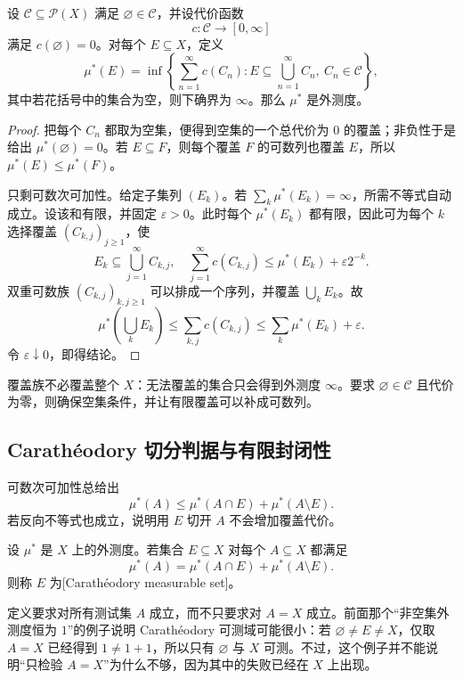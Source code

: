 \begin{proposition}
\label{b1:prop:covering-outer-measure}
设 \(\mathcal C\subseteq\mathcal P(X)\) 满足 \(\varnothing\in\mathcal C\)，并设代价函数
\[
c:\mathcal C\longrightarrow[0,\infty]
\]
满足 \(c(\varnothing)=0\)。对每个 \(E\subseteq X\)，定义
\[
\mu^*(E)
=\inf\left\{\sum_{n=1}^{\infty}c(C_n):
E\subseteq\bigcup_{n=1}^{\infty}C_n,\ C_n\in\mathcal C\right\},
\]
其中若花括号中的集合为空，则下确界为 \(\infty\)。那么 \(\mu^*\) 是外测度。
\end{proposition}
\begin{proof}
把每个 \(C_n\) 都取为空集，便得到空集的一个总代价为 \(0\) 的覆盖；非负性于是给出 \(\mu^*(\varnothing)=0\)。若 \(E\subseteq F\)，则每个覆盖 \(F\) 的可数列也覆盖 \(E\)，所以 \(\mu^*(E)\leq\mu^*(F)\)。

只剩可数次可加性。给定子集列 \((E_k)\)。若 \(\sum_k\mu^*(E_k)=\infty\)，所需不等式自动成立。设该和有限，并固定 \(\varepsilon>0\)。此时每个 \(\mu^*(E_k)\) 都有限，因此可为每个 \(k\) 选择覆盖 \((C_{k,j})_{j\geq1}\)，使
\[
E_k\subseteq\bigcup_{j=1}^{\infty}C_{k,j},
\quad
\sum_{j=1}^{\infty}c(C_{k,j})
\leq\mu^*(E_k)+\varepsilon2^{-k}.
\]
双重可数族 \((C_{k,j})_{k,j\geq1}\) 可以排成一个序列，并覆盖 \(\bigcup_kE_k\)。故
\[
\mu^*\left(\bigcup_kE_k\right)
\leq\sum_{k,j}c(C_{k,j})
\leq\sum_k\mu^*(E_k)+\varepsilon.
\]
令 \(\varepsilon\downarrow0\)，即得结论。
\end{proof}

覆盖族不必覆盖整个 \(X\)：无法覆盖的集合只会得到外测度 \(\infty\)。要求 \(\varnothing\in\mathcal C\) 且代价为零，则确保空集条件，并让有限覆盖可以补成可数列。

\subsection{Carathéodory 切分判据与有限封闭性}
\label{b1:subsec:020302}

可数次可加性总给出
\[
\mu^*(A)
\leq\mu^*(A\cap E)+\mu^*(A\setminus E).
\]
若反向不等式也成立，说明用 \(E\) 切开 \(A\) 不会增加覆盖代价。

\begin{definition}
\label{b1:def:caratheodory-measurable}
设 \(\mu^*\) 是 \(X\) 上的外测度。若集合 \(E\subseteq X\) 对每个 \(A\subseteq X\) 都满足
\[
\mu^*(A)
=\mu^*(A\cap E)+\mu^*(A\setminus E).
\]
则称 \(E\) 为[Carathéodory measurable set]。
\end{definition}

定义要求对所有测试集 \(A\) 成立，而不只要求对 \(A=X\) 成立。前面那个“非空集外测度恒为 \(1\)”的例子说明 Carathéodory 可测域可能很小：若 \(\varnothing\neq E\neq X\)，仅取 \(A=X\) 已经得到 \(1\neq1+1\)，所以只有 \(\varnothing\) 与 \(X\) 可测。不过，这个例子并不能说明“只检验 \(A=X\)”为什么不够，因为其中的失败已经在 \(X\) 上出现。


